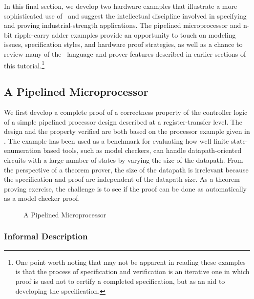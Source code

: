 In this final section, we develop two hardware examples that
illustrate a more sophisticated use of \pvs\ and suggest the
intellectual discipline involved in specifying and proving
industrial-strength applications.  The pipelined microprocessor and
n-bit ripple-carry adder examples provide an opportunity to touch on
modeling issues, specification styles, and hardware proof strategies,
as well as a chance to review many of the \pvs\ language and prover
features described in earlier sections of this tutorial.\footnote{One
point worth noting that may not be apparent in reading these examples
is that the process of specification and verification is an iterative one in
which proof is used not to certify a completed specification, but
as an aid to developing the specification.}



\subsection{A Pipelined Microprocessor}

We first develop a complete proof of a correctness property of the
controller logic of a simple pipelined processor design described at a
register-transfer level.  The design and the property verified are
both based on the processor example given in \cite{Clarke-etal90}.
The example has been used as a benchmark for evaluating how well
finite state-enumeration based tools, such as model checkers, can
handle datapath-oriented circuits with a large number of states by
varying the size of the datapath.  From the perspective of a theorem
prover, the size of the datapath is irrelevant because the
specification and proof are independent of the datapath size.  As a
theorem proving exercise, the challenge is to see if the proof can be
done as automatically as a model checker proof.

\begin{figure}[b]
\begin{center}

\end{center}
\caption{A Pipelined Microprocessor}
\label{clarkepipefig}
\end{figure}

\subsubsection{Informal Description}

